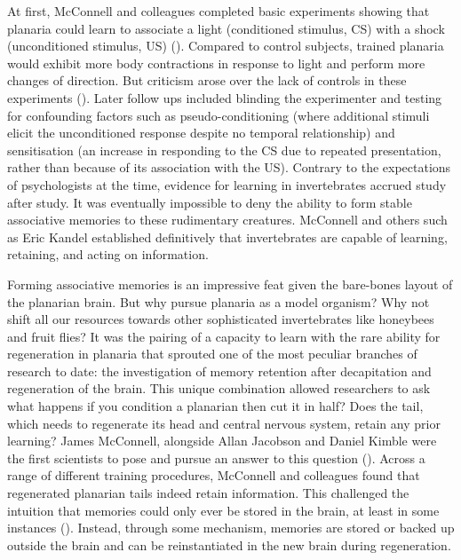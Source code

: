 \documentclass[
  jou,
  floatsintext,
  longtable,
  nolmodern,
  notxfonts,
  notimes,
  donotrepeattitle,
  colorlinks=true,linkcolor=blue,citecolor=blue,urlcolor=blue]{apa7}
\begin{document}
At first, McConnell and colleagues completed basic experiments showing
that planaria could learn to associate a light (conditioned stimulus,
CS) with a shock (unconditioned stimulus, US)
().
Compared to control subjects, trained planaria would exhibit more body
contractions in response to light and perform more changes of direction.
But criticism arose over the lack of controls in these experiments
(). Later follow ups
included blinding the experimenter and testing for confounding factors
such as pseudo-conditioning (where additional stimuli elicit the
unconditioned response despite no temporal relationship) and
sensitisation (an increase in responding to the CS due to repeated
presentation, rather than because of its association with the US).
Contrary to the expectations of psychologists at the time, evidence for
learning in invertebrates accrued study after study. It was eventually
impossible to deny the ability to form stable associative memories to
these rudimentary creatures. McConnell and others such as Eric Kandel
established definitively that invertebrates are capable of learning,
retaining, and acting on information.

Forming associative memories is an impressive feat given the bare-bones
layout of the planarian brain. But why pursue planaria as a model
organism? Why not shift all our resources towards other sophisticated
invertebrates like honeybees and fruit flies? It was the pairing of a
capacity to learn with the rare ability for regeneration in planaria
that sprouted one of the most peculiar branches of research to date: the
investigation of memory retention after decapitation and regeneration of
the brain. This unique combination allowed researchers to ask what
happens if you condition a planarian then cut it in half? Does the tail,
which needs to regenerate its head and central nervous system, retain
any prior learning? James McConnell, alongside Allan Jacobson and Daniel
Kimble were the first scientists to pose and pursue an answer to this
question (). Across a range of different training procedures, McConnell and
colleagues found that regenerated planarian tails indeed retain
information. This challenged the intuition that memories could only ever
be stored in the brain, at least in some instances
(). Instead,
through some mechanism, memories are stored or backed up outside the
brain and can be reinstantiated in the new brain during regeneration.
\end{document}
